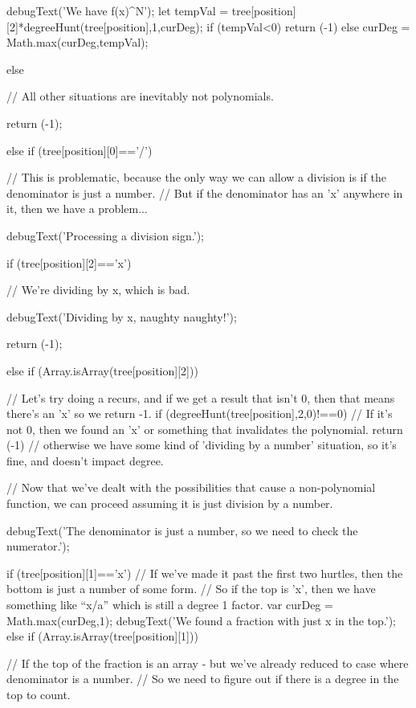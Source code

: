 \begin{javascript}
{{{            debugText('We have f(x)^N');
            let tempVal = tree[position][2]*degreeHunt(tree[position],1,curDeg);
            if (tempVal<0) { return (-1)} else {
                curDeg = Math.max(curDeg,tempVal);
            }

            
        } else {
            // All other situations are inevitably not polynomials.
            
            return (-1);
        }
    } else if (tree[position][0]=='/') {
        // This is problematic, because the only way we can allow a division is if the denominator is just a number.
        //  But if the denominator has an 'x' anywhere in it, then we have a problem...
        
        debugText('Processing a division sign.');
        
        if (tree[position][2]=='x') {
            // We're dividing by x, which is bad.
            
            debugText('Dividing by x, naughty naughty!');
            
            return (-1);
        } else if (Array.isArray(tree[position][2])) {
            //  Let's try doing a recurs, and if we get a result that isn't 0, then that means there's an 'x' so we return -1.
            if (degreeHunt(tree[position],2,0)!==0) {
                // If it's not 0, then we found an 'x' or something that invalidates the polynomial.
                return (-1)
            } // otherwise we have some kind of 'dividing by a number' situation, so it's fine, and doesn't impact degree.
            
        }
        
        // Now that we've dealt with the possibilities that cause a non-polynomial function, we can proceed assuming it is just division by a number.
        
        debugText('The denominator is just a number, so we need to check the numerator.');
        
        if (tree[position][1]=='x') {
            // If we've made it past the first two hurtles, then the bottom is just a number of some form.
            //  So if the top is 'x', then we have something like ``x/a'' which is still a degree 1 factor.
            var curDeg = Math.max(curDeg,1);
            debugText('We found a fraction with just x in the top.');
        } else if (Array.isArray(tree[position][1])) {
            // If the top of the fraction is an array - but we've already reduced to case where denominator is a number.
            //  So we need to figure out if there is a degree in the top to count.
            
}}}
\end{javascript}
